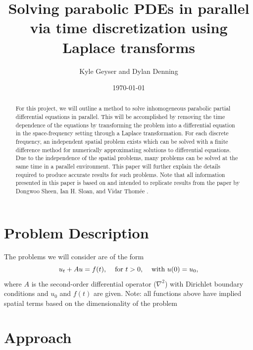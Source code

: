 \documentclass[letterpaper, 12pt]{article}
\title{Solving parabolic PDEs in parallel via time discretization using Laplace transforms}
\author{Kyle Geyser and Dylan Denning}
\date{\today}
\begin{document}
	\maketitle
	
	\vspace{3cm}

	\begin{abstract}
		For this project, we will outline a method to solve inhomogeneous parabolic partial differential equations in parallel. This will be accomplished by removing the time dependence of the equations by transforming the problem into a differential equation in the space-frequency setting through a Laplace transformation. For each discrete frequency, an independent spatial problem exists which can be solved with a finite difference method for numerically approximating solutions to differential equations. Due to the independence of the spatial problems, many problems can be solved at the same time in a parallel environment. This paper will further explain the details required to produce accurate results for such problems. Note that all information presented in this paper is based on and intended to replicate results from the paper by Dongwoo Sheen, Ian H. Sloan, and Vidar Thom\'{e}e \cite{sheen03}.  
	\end{abstract}
	
	\pagebreak
	
	\section*{Problem Description}
		The problems we will consider are of the form
		$$u_t+Au=f(t),\hspace{4mm}\text{for }t>0,\hspace{4mm}\text{with }u(0)=u_0,$$
		where $A$ is the second-order differential operator ($\nabla^2$) with Dirichlet boundary conditions and $u_0$ and $f(t)$ are given.
		Note: all functions above have implied spatial terms based on the dimensionality of the problem

	\section*{Approach}
\end{document}

